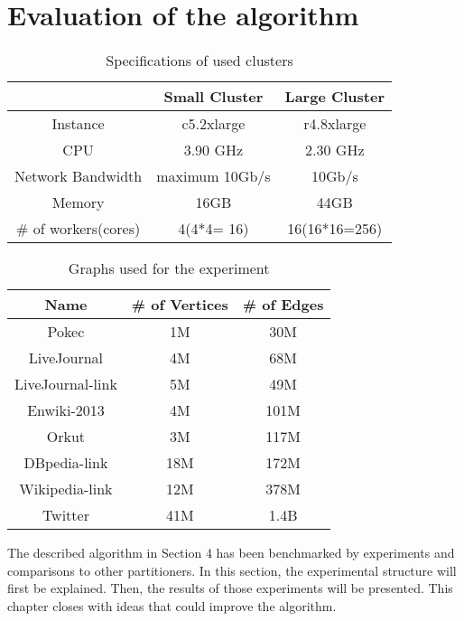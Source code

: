 \documentclass[acmsmall,nonacm,screen,review]{acmart}
\begin{document}
\section{Evaluation of the algorithm}
\begin{table}[bt!]
    \centering
    \begin{tabular}{ccc}
    \hline
     & Small Cluster & Large Cluster \\
    \hline
     Instance & c5.2xlarge & r4.8xlarge\\
     CPU & 3.90 GHz & 2.30 GHz\\
     Network Bandwidth & maximum 10Gb/s & 10Gb/s\\
    Memory  & 16GB & 44GB\\
     \# of workers(cores) & 4(4*4= 16) & 16(16*16=256)\\
     \hline
    \end{tabular}
    \caption{Specifications of used clusters}
    \label{clusters}
\end{table}
\begin{table}[bt!]
    \centering
    \begin{tabular}{ccc}
    \hline
    Name & \# of Vertices & \# of Edges \\
    \hline
     Pokec & 1M & 30M\\
     LiveJournal & 4M & 68M\\
     LiveJournal-link & 5M & 49M \\
     Enwiki-2013 & 4M & 101M \\
     Orkut & 3M & 117M\\
     DBpedia-link & 18M & 172M \\
     Wikipedia-link & 12M & 378M\\
     Twitter & 41M & 1.4B\\
     \hline
    \end{tabular}
    \caption{Graphs used for the experiment}
    \label{graphs}
\end{table}
The described algorithm in Section 4 has been benchmarked by experiments and comparisons to other partitioners. In this section, the experimental structure will first be explained. Then, the results of those experiments will be presented. This chapter closes with ideas that could improve the algorithm.
\end{document}
